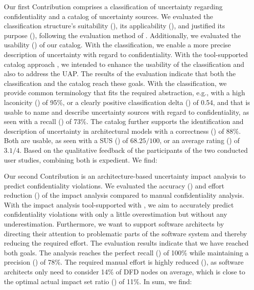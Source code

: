 Our first Contribution  comprises a classification of uncertainty regarding confidentiality and a catalog of uncertainty sources.
We evaluated the classification structure's suitability (), its applicability (), and justified its purpose (), following the evaluation method of \textcite{kaplan_introducing_2022}.
Additionally, we evaluated the usability () of our catalog.
With the classification, we enable a more precise description of uncertainty with regard to confidentiality.
With the tool-supported catalog approach \arcen, we intended to enhance the usability of the classification and also to address the \ac{UAP}.
The results of the evaluation indicate that both the classification and the catalog reach these goals.
With the classification, we provide common terminology that fits the required abstraction, e.g., with a high laconicity () of 95\%, or a clearly positive classification delta () of 0.54, and that is usable to name and describe uncertainty sources with regard to confidentiality, as seen with a recall () of 73\%.
The catalog further supports the identification and description of uncertainty in architectural models with a correctness () of 88\%.
Both are usable, as seen with a \ac{SUS} () of $68.25 / 100$, or an average rating () of $3.1 / 4$.
Based on the qualitative feedback of the participants of the two conducted user studies, combining both is expedient.
We find:


Our second Contribution  is an architecture-based uncertainty impact analysis to predict confidentiality violations.
We evaluated the accuracy () and effort reduction () of the impact analysis compared to manual confidentiality analysis.
With the impact analysis tool-supported with \uia, we aim to accurately predict confidentiality violations with only a little overestimation but without any underestimation.
Furthermore, we want to support software architects by directing their attention to problematic parts of the software system and thereby reducing the required effort.
The evaluation results indicate that we have reached both goals.
The analysis reaches the perfect recall () of 100\% while maintaining a precision () of 78\%.
The required manual effort is highly reduced (), as software architects only need to consider 14\% of \ac{DFD} nodes on average, which is close to the optimal actual impact set ratio () of 11\%.
In sum, we find:

